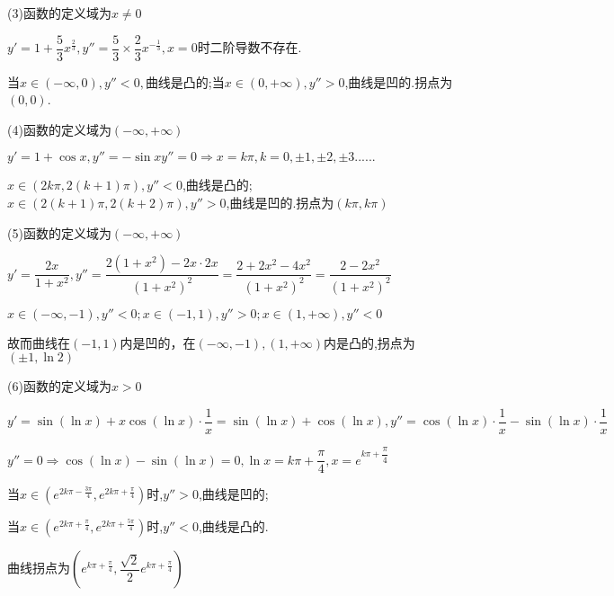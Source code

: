 (3)函数的定义域为$x \ne 0$

$y' = 1 + \dfrac{5}{3}{x^{\frac{2}{3}}},y'' = \dfrac{5}{3} \times \dfrac{2}{3}{x^{ - \frac{1}{3}}},x = 0$时二阶导数不存在.

当$x \in \left( { - \infty ,0} \right),y'' < 0,$曲线是凸的;当$x \in \left( {0, + \infty } \right),y'' > 0$,曲线是凹的.拐点为$(0,0)$.

(4)函数的定义域为$\left( { - \infty , + \infty } \right)$

$y' = 1 + \cos x,y'' =  - \sin x$$y'' = 0 \Rightarrow x = k\pi ,k = 0, \pm 1, \pm 2, \pm 3......$

$x \in \left( {2k\pi ,2\left( {k + 1} \right)\pi } \right),y'' < 0$,曲线是凸的;$x \in \left( {2\left( {k + 1} \right)\pi ,2\left( {k + 2} \right)\pi } \right),y'' > 0$,曲线是凹的.拐点为$\left( {k\pi ,k\pi } \right)$


(5)函数的定义域为$\left( { - \infty , + \infty } \right)$

$y' = \dfrac{{2x}}{{1 + {x^2}}},y'' = \dfrac{{2\left( {1 + {x^2}} \right) - 2x \cdot 2x}}{{{{\left( {1 + {x^2}} \right)}^2}}} = \dfrac{{2 + 2{x^2} - 4{x^2}}}{{{{\left( {1 + {x^2}} \right)}^2}}} = \dfrac{{2 - 2{x^2}}}{{{{\left( {1 + {x^2}} \right)}^2}}}$

$x \in \left( { - \infty , - 1} \right),y'' < 0;x \in \left( { - 1,1} \right),y'' > 0;x \in \left( {1, + \infty } \right),y'' < 0$

故而曲线在$\left( { - 1,1} \right)$内是凹的，在$\left( { - \infty , - 1} \right),\left( {1, + \infty } \right)$内是凸的,拐点为$\left( { \pm 1,\ln 2} \right)$

(6)函数的定义域为$x > 0$

$y' = \sin \left( {\ln x} \right) + x\cos \left( {\ln x} \right) \cdot \dfrac{1}{x} = \sin \left( {\ln x} \right) + \cos \left( {\ln x} \right),y'' = \cos \left( {\ln x} \right) \cdot \dfrac{1}{x} - \sin \left( {\ln x} \right) \cdot \dfrac{1}{x}$

$y'' = 0 \Rightarrow \cos \left( {\ln x} \right) - \sin \left( {\ln x} \right) = 0,\ln x = k\pi  + \dfrac{\pi }{4},x = {e^{k\pi  + \dfrac{\pi }{4}}}$

当$x \in \left( {{e^{2k\pi  - \frac{{3\pi }}{4}}},{e^{2k\pi  + \frac{\pi }{4}}}} \right)$时,$y'' > 0$,曲线是凹的;

当$x \in \left( {{e^{2k\pi  + \frac{\pi }{4}}},{e^{2k\pi  + \frac{{5\pi }}{4}}}} \right)$时,$y'' < 0$,曲线是凸的.

曲线拐点为$\left( {{e^{k\pi  + \frac{\pi }{4}}},\dfrac{{\sqrt 2 }}{2}{e^{k\pi  + \frac{\pi }{4}}}} \right)$

